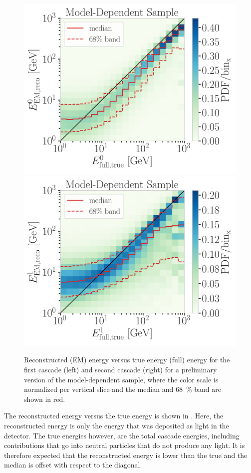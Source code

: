 \begin{figure}[h]
	\centering
    \includegraphics[width=0.49\linewidth]{figures/results/190607/resolutions/casc0_reco_energy_vs_casc0_true_energy_final_level_good_step_contours.png}
    \includegraphics[width=0.49\linewidth]{figures/results/190607/resolutions/casc1_reco_energy_vs_casc1_true_energy_final_level_good_step_contours.png}
    \caption[Reconstructed cascade energies versus true energies - preliminary model-dependent sample]{Reconstructed (EM) energy versus true energy (full) energy for the first cascade (left) and second cascade (right) for a preliminary version of the model-dependent sample, where the color scale is normalized per vertical slice and the median and \SI{68}{\percent} band are shown in red.}
\end{figure}

The reconstructed energy versus the true energy is shown in . Here, the reconstructed energy is only the energy that was deposited as light in the detector. The true energies however, are the total cascade energies, including contributions that go into neutral particles that do not produce any light. It is therefore expected that the reconstructed energy is lower than the true and the median is offset with respect to the diagonal.

